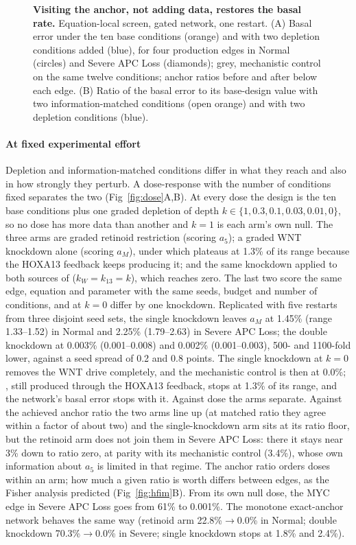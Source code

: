 \begin{figure}[tbp]
\centering
{}
\caption{\textbf{Visiting the anchor, not adding data, restores the basal rate.}
Equation-local screen, gated network, one restart. (A) Basal error under the
ten base conditions (orange) and with two depletion conditions added (blue),
for four production edges in Normal (circles) and Severe APC Loss (diamonds);
grey, mechanistic control on the same twelve conditions; anchor ratios before
and after below each edge. (B) Ratio of the basal error to its base-design value
with two information-matched conditions (open orange) and with two depletion
conditions (blue).}
\label{fig:depletion}
\end{figure}

\paragraph{At fixed experimental effort} Depletion and information-matched
conditions differ in what they reach and also in how strongly they perturb. A
dose-response with the number of conditions fixed separates the two
(Fig~\ref{fig:dose}A,B). At every dose the design is the ten base conditions
plus one graded depletion of depth $k\in\{1,0.3,0.1,0.03,0.01,0\}$, so no dose
has more data than another and $k=1$ is each arm's own null. The three arms are
graded retinoid restriction (scoring $a_5$); a graded WNT knockdown alone
(scoring $a_M$), under which \bcat{} plateaus at 1.3\% of its range because the
HOXA13 feedback keeps producing it; and the same knockdown applied to both
sources of \bcat{} ($k_W=k_{13}=k$), which reaches zero. The last two score the
same edge, equation and parameter with the same seeds, budget and number of
conditions, and at $k=0$ differ by one knockdown. Replicated with five restarts
from three disjoint seed sets, the single knockdown leaves $a_M$ at 1.45\%
(range 1.33--1.52) in Normal and 2.25\% (1.79--2.63) in Severe APC Loss; the
double knockdown at 0.003\% (0.001--0.008) and 0.002\% (0.001--0.003), 500- and
1100-fold lower, against a seed spread of 0.2 and 0.8 points. The single
knockdown at $k=0$ removes the WNT drive completely, and the mechanistic control
is then at 0.0\%; \bcat{}, still produced through the HOXA13 feedback, stops at
1.3\% of its range, and the network's basal error stops with it. Against dose the arms separate. Against the
achieved anchor ratio the two \bcat{} arms line up (at matched ratio they agree
within a factor of about two) and the single-knockdown arm sits at its ratio
floor, but the retinoid arm does not join them in Severe APC Loss: there it
stays near 3\% down to ratio zero, at parity with its mechanistic control (3.4\%),
whose own information about $a_5$ is limited in that regime. The anchor ratio
orders doses within an arm; how much a given ratio is worth differs between
edges, as the Fisher analysis predicted (Fig~\ref{fig:hfim}B). From its own null
dose, the MYC edge in Severe APC Loss goes from 61\% to 0.001\%. The monotone
exact-anchor network behaves the same way (retinoid arm 22.8\%$\to$0.0\% in
Normal; double knockdown 70.3\%$\to$0.0\% in Severe; single knockdown stops at
1.8\% and 2.4\%).


